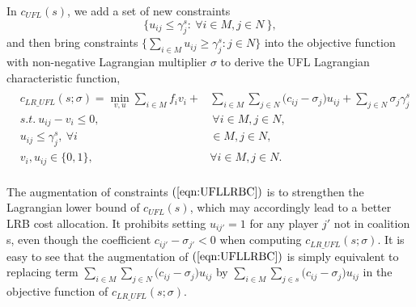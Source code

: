 \documentclass[ijoc,nonblindrev]{informs3} %
\begin{document}


In $c_{UFL}(s)$,  we add a set of new constraints 
\begin{equation}\label{eqn:UFLLRBC}
\big\{ u_{ij} \leq \gamma_j^s: ~\forall i \in M, j \in N\ \big\},
\end{equation}
and then bring constraints $\{ \sum_{i \in M} u_{ij} \geq \gamma_j^s:j \in N \}$ into the objective function with non-negative Lagrangian multiplier $\sigma$ to derive the UFL Lagrangian characteristic function,
\begin{eqnarray*}\label{eqn:LRPGCF}
\begin{aligned}
\begin{split}
c_{LR\_UFL}(s;\sigma) = \min_{v,u} \sum_{i \in M} f_iv_i + &\sum_{i \in M} \sum_{j \in N} \big(c_{ij} - \sigma_{j}\big)u_{ij} + \sum_{j \in N} \sigma_j \gamma_j^s\\
s.t.~u_{ij} - v_i \leq 0,&~\forall i \in M, j \in N,\\
u_{ij} \leq \gamma_j^s,~\forall i& \in M, j \in N,\\
v_i,u_{ij} \in \{0,1\},~&\forall i \in M, j \in N.
\end{split}
\end{aligned}
\end{eqnarray*}


The augmentation of constraints $(\ref{eqn:UFLLRBC})$ is to strengthen the Lagrangian lower bound of $c_{UFL}(s)$, which may accordingly lead to a better LRB cost allocation.
It prohibits setting $u_{ij'}=1$ for any player $j'$ not in coalition s, even though the coefficient $c_{ij'}- \sigma_{j'}<0$ when computing $c_{LR\_UFL}(s;\sigma)$. 
It is easy to see that the augmentation of $(\ref{eqn:UFLLRBC})$ is simply equivalent to replacing term $\sum_{i \in M} \sum_{j \in N} \big(c_{ij} - \sigma_{j}\big)u_{ij}$ by $\sum_{i \in M} \sum_{j \in s} \big(c_{ij} - \sigma_{j}\big)u_{ij}$ in the objective function of $c_{LR\_UFL}(s;\sigma)$.
\end{document}
